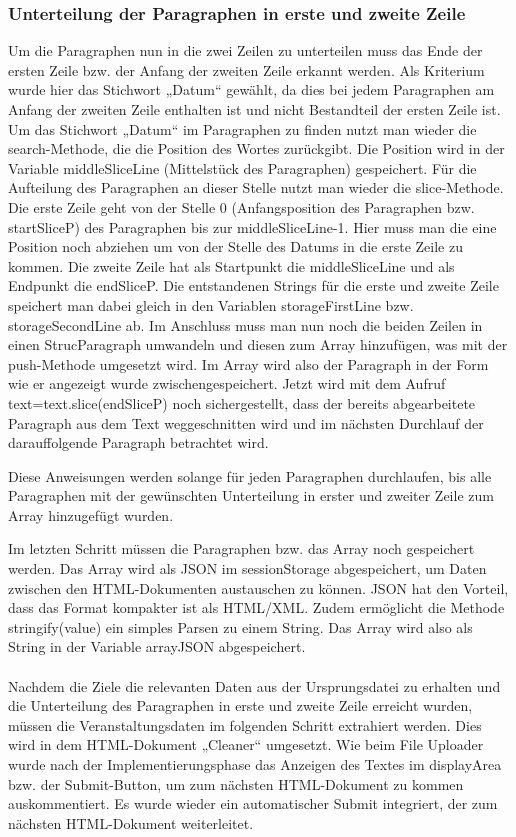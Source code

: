 {\subsubsection{Unterteilung der Paragraphen in erste und zweite Zeile}
Um die Paragraphen nun in die zwei Zeilen zu unterteilen muss das Ende der ersten Zeile bzw. der Anfang der zweiten Zeile erkannt werden. Als Kriterium wurde hier das Stichwort „Datum“ gewählt, da dies bei jedem Paragraphen am Anfang der zweiten Zeile enthalten ist und nicht Bestandteil der ersten Zeile ist. Um das Stichwort „Datum“ im Paragraphen zu finden nutzt man wieder die search-Methode, die die Position des Wortes zurückgibt. Die Position wird in der Variable middleSliceLine (Mittelstück des Paragraphen) gespeichert. Für die Aufteilung des Paragraphen an dieser Stelle nutzt man wieder die slice-Methode. Die erste Zeile geht von der Stelle 0 (Anfangsposition des Paragraphen bzw. startSliceP) des Paragraphen bis zur middleSliceLine-1. Hier muss man die eine Position noch abziehen um von der Stelle des Datums in die erste Zeile zu kommen. Die zweite Zeile hat als Startpunkt die middleSliceLine und als Endpunkt die endSliceP. Die entstandenen Strings für die erste und zweite Zeile speichert man dabei gleich in den Variablen storageFirstLine bzw. storageSecondLine ab. Im Anschluss muss man nun noch die beiden Zeilen in einen StrucParagraph umwandeln und diesen zum Array hinzufügen, was mit der push-Methode umgesetzt wird. Im Array wird also der Paragraph in der Form wie er angezeigt wurde zwischengespeichert. Jetzt wird mit dem Aufruf text=text.slice(endSliceP) noch sichergestellt, dass der bereits abgearbeitete Paragraph aus dem Text weggeschnitten wird und im nächsten Durchlauf der darauffolgende Paragraph betrachtet wird.

Diese Anweisungen werden solange für jeden Paragraphen durchlaufen, bis alle Paragraphen mit der gewünschten Unterteilung in erster und zweiter Zeile zum Array hinzugefügt wurden.

Im letzten Schritt müssen die Paragraphen bzw. das Array noch gespeichert werden. Das Array wird als \ac{JSON} im sessionStorage abgespeichert, um Daten zwischen den HTML-Dokumenten austauschen zu können. JSON hat den Vorteil, dass das Format kompakter ist als HTML/XML. Zudem ermöglicht die Methode stringify(value) ein simples Parsen zu einem String. Das Array wird also als String in der Variable arrayJSON abgespeichert. \\
\\
Nachdem die Ziele die relevanten Daten aus der Ursprungsdatei zu erhalten und die Unterteilung des Paragraphen in erste und zweite Zeile erreicht wurden, müssen die Veranstaltungsdaten im folgenden Schritt extrahiert werden. Dies wird in dem HTML-Dokument „Cleaner“ umgesetzt. Wie beim File Uploader wurde nach der Implementierungsphase das Anzeigen des Textes im displayArea bzw. der Submit-Button, um zum nächsten HTML-Dokument zu kommen auskommentiert. Es wurde wieder ein automatischer Submit integriert, der zum nächsten HTML-Dokument weiterleitet.

}
